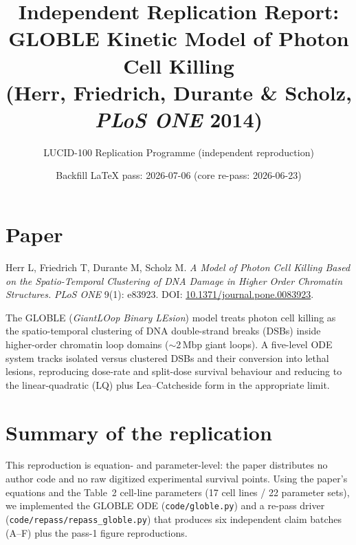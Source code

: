 \documentclass[11pt]{article}
\title{Independent Replication Report:\\
GLOBLE Kinetic Model of Photon Cell Killing\\
(Herr, Friedrich, Durante \& Scholz, \textit{PLoS ONE} 2014)}
\author{LUCID-100 Replication Programme (independent reproduction)}
\date{Backfill LaTeX pass: 2026-07-06 \quad (core re-pass: 2026-06-23)}
\begin{document}
\maketitle

\section{Paper}
Herr L, Friedrich T, Durante M, Scholz M. \emph{A Model of Photon Cell Killing
Based on the Spatio-Temporal Clustering of DNA Damage in Higher Order Chromatin
Structures.} \textit{PLoS ONE} 9(1): e83923.
DOI: \href{https://doi.org/10.1371/journal.pone.0083923}{10.1371/journal.pone.0083923}.

The GLOBLE (\emph{GiantLOop Binary LEsion}) model treats photon cell killing as
the spatio-temporal clustering of DNA double-strand breaks (DSBs) inside
higher-order chromatin loop domains ($\sim$2\,Mbp giant loops). A five-level ODE
system tracks isolated versus clustered DSBs and their conversion into lethal
lesions, reproducing dose-rate and split-dose survival behaviour and reducing to
the linear-quadratic (LQ) plus Lea--Catcheside form in the appropriate limit.

\section{Summary of the replication}
This reproduction is equation- and parameter-level: the paper distributes no
author code and no raw digitized experimental survival points. Using the paper's
equations and the Table~2 cell-line parameters (17 cell lines / 22 parameter
sets), we implemented the GLOBLE ODE (\texttt{code/globle.py}) and a re-pass
driver (\texttt{code/repass/repass\_globle.py}) that produces six independent
claim batches (A--F) plus the pass-1 figure reproductions.
\end{document}
